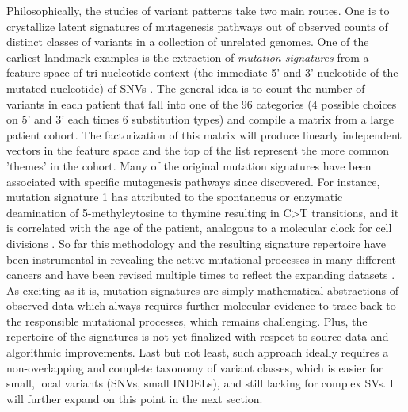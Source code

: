 \documentclass[phd,tocprelim]{cornell}
\begin{document}
\label{sec}
Philosophically, the studies of variant patterns take two main routes. One is to crystallize latent signatures of mutagenesis pathways out of observed counts of distinct classes of variants in a collection of unrelated genomes. One of the earliest landmark examples is the extraction of \textit{mutation signatures} from a feature space of tri-nucleotide context (the immediate 5' and 3' nucleotide of the mutated nucleotide) of SNVs \cite{Alexandrov2013-zv}. The general idea is to count the number of variants in each patient that fall into one of the 96 categories (4 possible choices on 5' and 3' each times 6 substitution types) and compile a matrix from a large patient cohort. The factorization of this matrix will produce linearly independent vectors in the feature space and the top of the list represent the more common 'themes' in the cohort. Many of the original mutation signatures have been associated with specific mutagenesis pathways since discovered. For instance, mutation signature 1 has attributed to the spontaneous or enzymatic deamination of 5-methylcytosine to thymine resulting in C>T transitions, and it is correlated with the age of the patient, analogous to a molecular clock for cell divisions \cite{alexandrov2013}. So far this methodology and the resulting signature repertoire have been instrumental in revealing the active mutational processes in many different cancers \cite{Choi2021-pu} and have been revised multiple times to reflect the expanding datasets \cite{Alexandrov2020-by}. As exciting as it is, mutation signatures are simply mathematical abstractions of observed data which always requires further molecular evidence to trace back to the responsible mutational processes, which remains challenging. Plus, the repertoire of the signatures is not yet finalized with respect to source data and algorithmic improvements. Last but not least, such approach ideally requires a non-overlapping and complete taxonomy of variant classes, which is easier for small, local variants (SNVs, small INDELs), and still lacking for complex SVs. I will further expand on this point in the next section.
\end{document}

